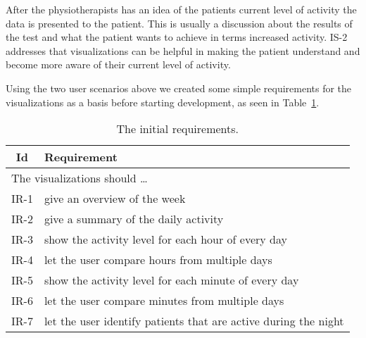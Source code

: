After the physiotherapists has an idea of the patients current level of activity the data is presented to the patient. This is usually a discussion about the results of the test and what the patient wants to achieve in terms increased activity. IS-2 addresses that visualizations can be helpful in making the patient understand and become more aware of their current level of activity.

Using the two user scenarios above we created some simple requirements for the visualizations as a basis before starting development, as seen in Table~\ref{tab:initialRequirements1}.

\clearpage

\begin{table}[t]
  \begin{center}
  \begin{tabular}{|c|p{12cm}|}
    \hline
      \textbf{Id} & \textbf{Requirement} \\ \hline
    \multicolumn{2}{|l|}{The visualizations should \ldots} \\ \hline
      IR-1 & give an overview of the week \\ \hline
      IR-2 & give a summary of the daily activity \\ \hline
      IR-3 & show the activity level for each hour of every day \\ \hline
      IR-4 & let the user compare hours from multiple days \\ \hline
      IR-5 & show the activity level for each minute of every day \\ \hline
      IR-6 & let the user compare minutes from multiple days \\ \hline
      IR-7 & let the user identify patients that are active during the night \\ \hline
  \end{tabular}
  \end{center}
  \caption[Initial requirements]{The initial requirements.}
  \label{tab:initialRequirements1}
\end{table}
